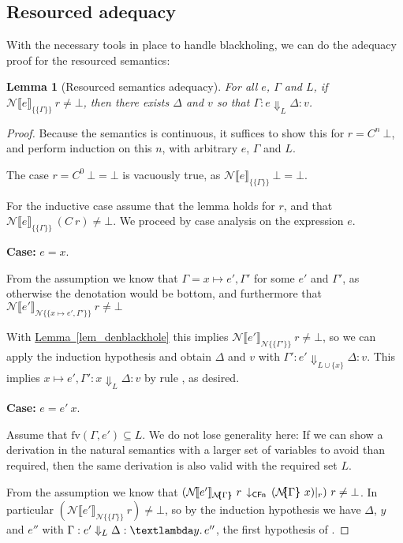 \documentclass{jfp1}
\newcommand{\myref}[2]{\hyperref[#2]{#1~\ref*{#2}}}
\newtheorem{lemma}{Lemma}
\theoremstyle{nonumberbreak}
\newtheorem{proof}{Proof}
\newcommand{\sCFnProj}[2]{#1\,\downarrow_{\text{\textsf{CFn}}}\,#2}
\newcommand{\sLam}[2]{\text{\textlambda} #1.\, #2}
\newcommand{\sred}[5]{#1 : #2 \Downarrow_{#3} #4 : #5}
\newcommand{\sRule}[1]{\text{{\textsc{#1}}}}
\newcommand{\fv}[1]{\text{fv}(#1)}
\newcommand{\esem}[1]{\{\!\!\!\{#1\}\!\!\!\}}
\newcommand{\dsemr}[2]{\mathcal N\!\llbracket #1 \rrbracket_{#2}}
\newcommand{\esemr}[1]{\mathcal N\!\!\{\!\!\!\{#1\}\!\!\!\}}
\newcommand{\Crestr}[2]{ #1 |_{#2}}
\newcommand{\case}[1]{\par\smallskip\noindent\textbf{Case:} #1\nopagebreak\par\noindent\ignorespaces}
\begin{document}
\subsection{Resourced adequacy}
\label{sec_resourced_adequacy}

With the necessary tools in place to handle blackholing, we can do the adequacy proof for the resourced semantics:

\begin{lemma}[Resourced semantics adequacy]
\label{lem_resad}
For all $e$, $\Gamma$ and $L$,  if $\dsemr{e}{\esem{\Gamma}}~r \ne \bot$, then there exists $\Delta$ and $v$ so that $\sred \Gamma e L \Delta v$.
\end{lemma}

\begin{proof}
Because the semantics is continuous, it suffices to show this for $r = C^n~\bot$, and perform induction on this $n$, with arbitrary $e$, $\Gamma$ and $L$.

The case $r=C^0~\bot = \bot$ is vacuously true, as $\dsemr{e}{\esem{\Gamma}}~\bot = \bot$.

For the inductive case assume that the lemma holds for $r$, and that $\dsemr{e}{\esem{\Gamma}}~(C~r) \ne \bot$. We proceed by case analysis on the expression $e$.

\case{$e = x$.}
From the assumption we know that $\Gamma = x\mapsto e',\Gamma'$ for some $e'$ and $\Gamma'$, as otherwise the denotation would be bottom, and furthermore that $\dsemr{e'}{\esemr{x\mapsto e',\Gamma'}}~r \ne\bot$

With \myref{Lemma}{lem_denblackhole} this implies $\dsemr{e'}{\esemr{\Gamma'}}~r \ne\bot$, so we can apply the induction hypothesis and obtain $\Delta$ and $v$ with $\sred {\Gamma'} {e'} {L\cup\{x\}} \Delta v$. This implies $\sred {x\mapsto e',\Gamma'} {x} {L} \Delta v$ by rule \sRule{Var}, as desired.

\case{$e = e'~x$.}
Assume that $\fv{\Gamma, e'} \subseteq L$. We do not lose generality here: If we can show a derivation in the natural semantics with a larger set of variables to avoid than required, then the same derivation is also valid with the required set $L$.

From the assumption we know that
$\sCFnProj {(\dsemr {e'} {\esemr{\Gamma}}~r}{\Crestr{({\esemr{\Gamma}}~x)}{r}})~r \ne \bot$. In particular $(\dsemr {e'} {\esemr{\Gamma}}~r)\ne \bot$, so by the induction hypothesis we have $\Delta$, $y$ and $e''$ with $\sred{\Gamma}{e'}L\Delta {\sLam y {e''}}$, the first hypothesis of \sRule{App}.


\end{proof}
\end{document}
